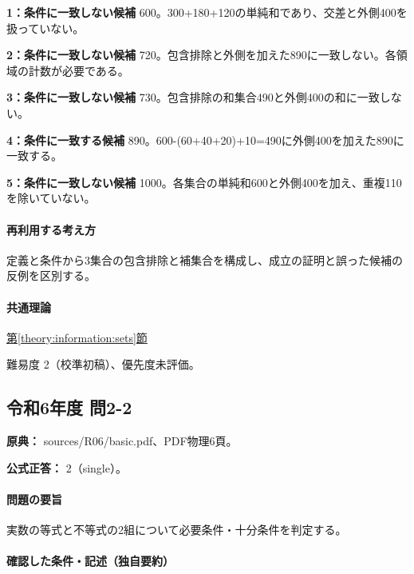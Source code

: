\noindent\textbf{1：条件に一致しない候補} 600。300+180+120の単純和であり、交差と外側400を扱っていない。\par

\noindent\textbf{2：条件に一致しない候補} 720。包含排除と外側を加えた890に一致しない。各領域の計数が必要である。\par

\noindent\textbf{3：条件に一致しない候補} 730。包含排除の和集合490と外側400の和に一致しない。\par

\noindent\textbf{4：条件に一致する候補} 890。600-(60+40+20)+10=\allowbreak{}490に外側400を加えた890に一致する。\par

\noindent\textbf{5：条件に一致しない候補} 1000。各集合の単純和600と外側400を加え、重複110を除いていない。\par

\paragraph{再利用する考え方} 定義と条件から3集合の包含排除と補集合を構成し、成立の証明と誤った候補の反例を区別する。

\paragraph{共通理論} \hyperref[theory:information:sets]{第\ref*{theory:information:sets}節}

\par 難易度 2（校準初稿）、優先度未評価。

\subsection{令和6年度 問2-2}
\label{q:r06-reg-basic-2-2}

\noindent\textbf{原典：} sources/R06/basic.pdf、PDF物理6頁。

\textbf{公式正答：} 2（single）。

\paragraph{問題の要旨} 実数の等式と不等式の2組について必要条件・十分条件を判定する。

\paragraph{確認した条件・記述（独自要約）}\mbox{}\par

